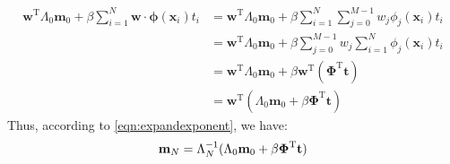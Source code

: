 \begin{equation}
\begin{split}
\mathbf{w}^{\mathrm{T}}\Lambda_{0}\mathbf{m}_{0}+\beta\sum_{i=1}^{N}\mathbf{w}\cdot\boldsymbol{\phi}(\mathbf{x}_i)t_{i}&=\mathbf{w}^{\mathrm{T}}\Lambda_{0}\mathbf{m}_{0}+\beta\sum_{i=1}^{N}\sum_{j=0}^{M-1}w_{j}\phi_{j}(\mathbf{x}_i)t_{i}\\
&=\mathbf{w}^{\mathrm{T}}\Lambda_{0}\mathbf{m}_{0}+\beta\sum_{j=0}^{M-1}w_{j}\sum_{i=1}^{N}\phi_{j}(\mathbf{x}_i)t_i\\
&=\mathbf{w}^{\mathrm{T}}\Lambda_{0}\mathbf{m}_{0}+\beta\mathbf{w}^{\mathrm{T}}(\boldsymbol{\Phi}^{\mathrm{T}}\mathbf{t})\\
&=\mathbf{w}^{\mathrm{T}}(\Lambda_{0}\mathbf{m}_{0}+\beta\boldsymbol{\Phi}^{\mathrm{T}}\mathbf{t})
\end{split}
\end{equation}
Thus, according to \eqref{eqn:expandexponent}, we have:
\begin{equation}
\mathbf{m}_{N}=\Lambda_{N}^{-1}(\Lambda_{0}\mathbf{m}_{0}+\beta\boldsymbol{\Phi}^{\mathrm{T}}\mathbf{t})\\
\end{equation}

